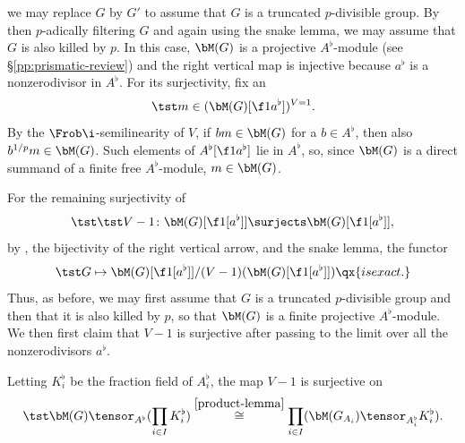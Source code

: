 we may replace $G$ by $G'$ to assume that $G$ is a truncated $p$-divisible group. By then $p$-adically filtering $G$ and again using the snake lemma, we may assume that $G$ is also killed by $p$. In this case, $\bM(G)$ is a projective $A^\flat$-module (see \S\ref{pp:prismatic-review}) and the right vertical map is injective because $a^\flat$ is a nonzerodivisor in $A^\flat$. %
For its surjectivity, fix an
\[
\tst m \in (\bM(G)[\f 1{a^\flat}])^{V = 1}.
\]
By the $\Frob\i$-semilinearity of $V$, if $bm \in \bM(G)$ for a $b \in A^\flat$, then also $b^{1/p}m \in \bM(G)$. Such elements of $A^\flat[\f 1{a^\flat}]$ lie in $A^\flat$, so, since $\bM(G)$ is a direct summand of a finite free $A^\flat$-module, $m \in \bM(G)$. %


For the remaining surjectivity of
\[
\tst \tst V - 1 \colon \bM(G)[\f 1{[a^\flat]}] \surjects \bM(G)[\f 1{[a^\flat]}],
\]
by , the bijectivity of the right vertical arrow, %
and the snake lemma, the functor
\[
\tst G \mapsto \bM(G)[\f 1{[a^\flat]}]/(V - 1)(\bM(G)[\f 1{[a^\flat]}]) \qx{is exact.}
\]
Thus, as before, we may first assume that $G$ is a truncated $p$-divisible group and then that it is also killed by $p$, so that $\bM(G)$ is a finite projective $A^\flat$-module. We then first claim that $V - 1$ is surjective after passing to the limit over all the nonzerodivisors   $a^\flat$.

\bcl \label{first-claim}
Letting $K_i^\flat$ be the fraction field of $A_i^\flat$, the map $V - 1$ is surjective on
\[
\tst \bM(G) \tensor_{A^\flat} (\prod_{i \in I} K_i^\flat) \overset{\ref{product-lemma}}{\cong}  \prod_{i \in I} (\bM(G_{A_i}) \tensor_{A_i^\flat} K_i^\flat).
\]
\ecl

